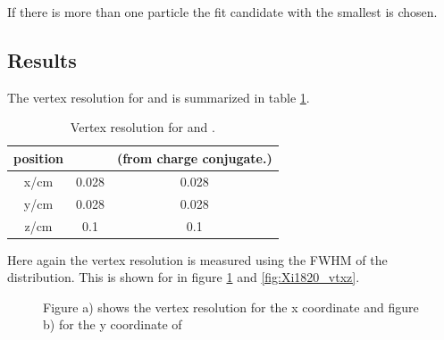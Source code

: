 		If there is more than one particle the fit candidate with the smallest \chisq is chosen.
		
	\subsection*{Results}
	The vertex resolution for \excitedcascade and \excitedanticascade is summarized in table \ref{tab:Xi1820_vtxres}.
	
	\begin{table}
		\centering
		\caption{\propose Vertex resolution for \excitedcascade and \excitedanticascade.}
		\label{tab:Xi1820_vtxres}
		\begin{tabular}{ccc}
			\hline
			position & \excitedcascade & \excitedanticascade (from charge conjugate.) \\
			\hline
			\hline
			x/cm & 0.028 & 0.028\\
			y/cm & 0.028 & 0.028\\
			z/cm & 0.1 & 0.1\\
			\hline
			 
		\end{tabular}
	\end{table}
	
	Here again the vertex resolution is measured using the FWHM of the distribution. 
	This is shown for \excitedcascade in figure \ref{fig:Xi1820_vtxxy} and \ref{fig:Xi1820_vtxz}.
	
	
	
	 \begin{figure}
		\centering
		\caption{\propose Figure a) shows the vertex resolution for the x coordinate and figure b) for the y coordinate of \excitedcascade}
		\label{fig:Xi1820_vtxxy}
	\end{figure}
	
